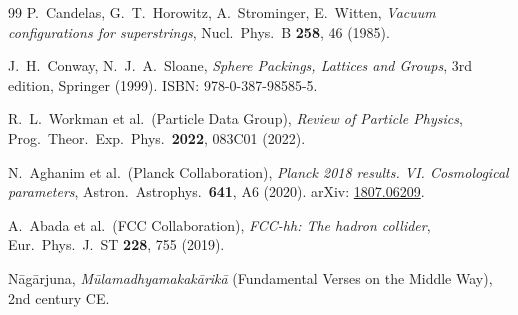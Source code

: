 \documentclass[11pt,a4paper]{article}
\theoremstyle{definition}
\begin{document}
\begin{thebibliography}{99}
P.~Candelas, G.~T.~Horowitz, A.~Strominger, E.~Witten,
\textit{Vacuum configurations for superstrings},
Nucl.\ Phys.\ B \textbf{258}, 46 (1985).

J.~H.~Conway, N.~J.~A.~Sloane,
\textit{Sphere Packings, Lattices and Groups},
3rd edition, Springer (1999).
ISBN: 978-0-387-98585-5.

R.~L.~Workman et al.\ (Particle Data Group),
\textit{Review of Particle Physics},
Prog.\ Theor.\ Exp.\ Phys.\ \textbf{2022}, 083C01 (2022).

N.~Aghanim et al.\ (Planck Collaboration),
\textit{Planck 2018 results. VI. Cosmological parameters},
Astron.\ Astrophys.\ \textbf{641}, A6 (2020).
arXiv: \href{https://arxiv.org/abs/1807.06209}{1807.06209}.

A.~Abada et al.\ (FCC Collaboration),
\textit{FCC-hh: The hadron collider},
Eur.\ Phys.\ J.\ ST \textbf{228}, 755 (2019).

N\=ag\=arjuna,
\textit{M\=ulamadhyamakak\=arik\=a} (Fundamental Verses on the Middle Way),
2nd century CE.

\end{thebibliography}


\newpage

\vspace*{2cm}
\end{document}
